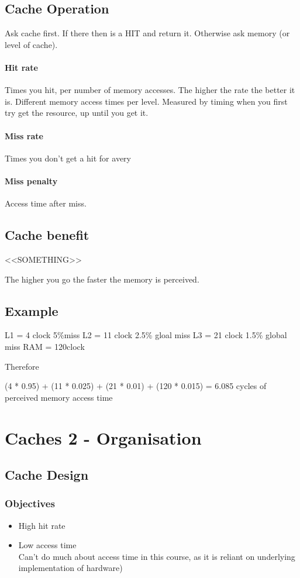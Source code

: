 \documentclass{article}
\begin{document}
	\subsection*{Cache Operation}
		Ask cache first. If there then is a HIT and return it. Otherwise ask memory (or level of cache).

		\paragraph{Hit rate}
		Times you hit, per number of memory accesses. The higher the rate the better it is. Different memory access times per level. Measured by timing when you first try get the resource, up until you get it.

		\paragraph{Miss rate}
		Times you don't get a hit for avery 

		\paragraph{Miss penalty}
		Access time after miss.

	\subsection*{Cache benefit}
		<<SOMETHING>>

		The higher you go the faster the memory is perceived.

	\subsection*{Example}
		L1 = 4 clock	5\%miss
		L2 = 11 clock	2.5\% gloal miss
		L3 = 21 clock	1.5\% global miss
		RAM = 120clock

		Therefore

		(4 * 0.95) + (11 * 0.025) + (21 * 0.01) + (120 * 0.015) = 6.085 cycles of perceived memory access time

\section{Caches 2 - Organisation}
	\subsection*{Cache Design}
		\subsubsection*{Objectives}
		\begin{itemize}
			\item High hit rate
			\item Low access time\\
			Can't do much about access time in this course, as it is reliant on underlying implementation of hardware)
		\end{itemize}
\end{document}
